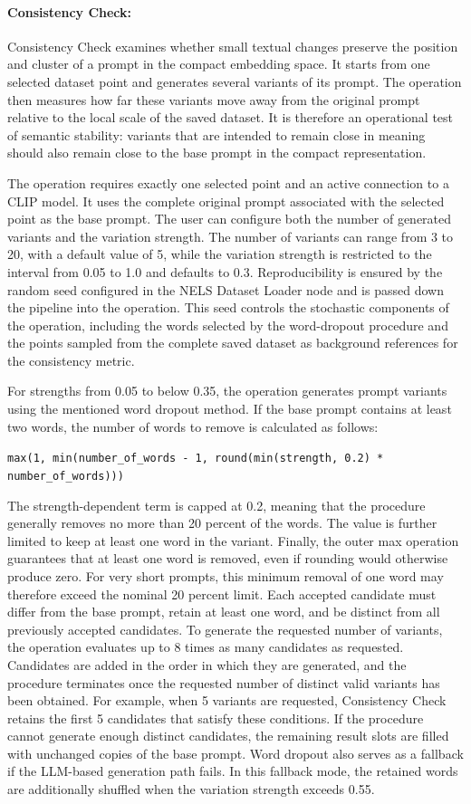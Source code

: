 \paragraph{Consistency Check:} Consistency Check examines whether small textual changes preserve the position and cluster of a prompt in the compact embedding space. It starts from one selected dataset point and generates several variants of its prompt. The operation then measures how far these variants move away from the original prompt relative to the local scale of the saved dataset. It is therefore an operational test of semantic stability: variants that are intended to remain close in meaning should also remain close to the base prompt in the compact representation.

The operation requires exactly one selected point and an active connection to a CLIP model. It uses the complete original prompt associated with the selected point as the base prompt. The user can configure both the number of generated variants and the variation strength. The number of variants can range from 3 to 20, with a default value of 5, while the variation strength is restricted to the interval from 0.05 to 1.0 and defaults to 0.3.
Reproducibility is ensured by the random seed configured in the NELS Dataset Loader node and is passed down the pipeline into the operation. This seed controls the stochastic components of the operation, including the words selected by the word-dropout procedure and the points sampled from the complete saved dataset as background references for the consistency metric.

For strengths from 0.05 to below 0.35, the operation generates prompt variants using the mentioned word dropout method. If the base prompt contains at least two words, the number of words to remove is calculated as follows:

\texttt{max(1, min(number\_of\_words - 1, round(min(strength, 0.2) * number\_of\_words)))}

The strength-dependent term is capped at 0.2, meaning that the procedure generally removes no more than 20 percent of the words. The value is further limited to keep at least one word in the variant. Finally, the outer max operation guarantees that at least one word is removed, even if rounding would otherwise produce zero. For very short prompts, this minimum removal of one word may therefore exceed the nominal 20 percent limit.
Each accepted candidate must differ from the base prompt, retain at least one word, and be distinct from all previously accepted candidates. To generate the requested number of variants, the operation evaluates up to 8 times as many candidates as requested. Candidates are added in the order in which they are generated, and the procedure terminates once the requested number of distinct valid variants has been obtained. For example, when 5 variants are requested, Consistency Check retains the first 5 candidates that satisfy these conditions. If the procedure cannot generate enough distinct candidates, the remaining result slots are filled with unchanged copies of the base prompt. Word dropout also serves as a fallback if the LLM-based generation path fails. In this fallback mode, the retained words are additionally shuffled when the variation strength exceeds 0.55.

